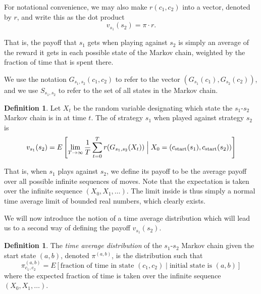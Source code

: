 \documentclass[12pt]{article}
\theoremstyle{definition}
\newtheorem{definition}[theorem]{Definition}
\theoremstyle{remark}
\begin{document}
For notational convenience, we may also make $r(c_1, c_2)$ into a vector, denoted by $r$, and write this as the dot product \begin{equation*}
  v_{s_1}(s_2) = \pi \cdot r.
\end{equation*}

That is, the payoff that $s_1$ gets when playing against $s_2$ is simply an average of the reward it gets in each possible state of the Markov chain, weighted by the fraction of time that is spent there.

\iffalse
We use the notation $G_{s_1,s_2}(c_1,c_2)$ to refer to the vector $(G_{s_1}(c_1), G_{s_2}(c_2))$, and we use $S_{s_1,s_2}$ to refer to the set of all states in the Markov chain.

\begin{definition}
  \label{strategypayoffs}
  Let $X_t$ be the random variable designating which state the $s_1$-$s_2$ Markov chain is in at time $t$. The  of strategy $s_1$ when played against strategy $s_2$ is 
  \begin{equation*}
    v_{s_1}(s_2) = E \left[ \lim_{T \to \infty} \frac{1}{T} \sum_{t=0}^T r(G_{s_1,s_2} (X_t)) \Bigm| X_0 = (c_{\text{start}}(s_1), c_{\text{start}}(s_2)) \right]
  \end{equation*}
\end{definition}

That is, when $s_1$ plays against $s_2$, we define its payoff to be the average payoff over all possible infinite sequences of moves. Note that the expectation is taken over the infinite sequence $(X_0, X_1, \ldots)$. The limit inside is thus simply a normal time average limit of bounded real numbers, which clearly exists. 

We will now introduce the notion of a time average distribution which will lead us to a second way of defining the payoff $v_{s_1}(s_2)$. 

\begin{definition}
  \label{timeaveragedistribution}
  The \textit{time average distribution} of the $s_1$-$s_2$ Markov chain given the start state $(a, b)$, denoted $\pi^{(a, b)}$, is the distribution such that \begin{equation*}
    \pi_{c_1, c_2}^{(a, b)} = E \left[ \text{fraction of time in state $(c_1,c_2)$} \mid \text{initial state is } (a, b)  \right]
  \end{equation*}
  where the expected fraction of time is taken over the infinite sequence $(X_0, X_1, \ldots)$.
\end{definition}
\end{document}
